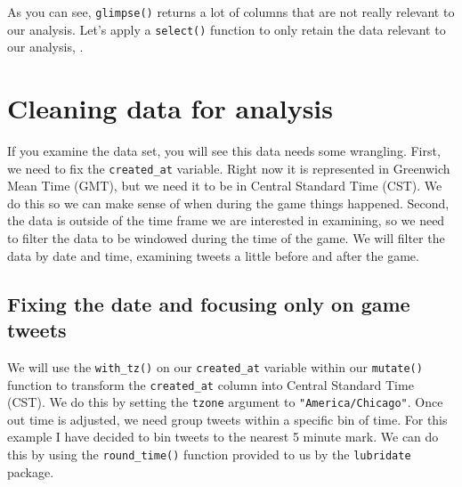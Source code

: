 \documentclass[
]{book}
\newenvironment{Shaded}{\begin{snugshade}}{\end{snugshade}}
\newcommand{\KeywordTok}[1]{\textcolor[rgb]{0.13,0.29,0.53}{\textbf{#1}}}
\newcommand{\NormalTok}[1]{#1}
\newcommand{\OperatorTok}[1]{\textcolor[rgb]{0.81,0.36,0.00}{\textbf{#1}}}
\newcommand{\StringTok}[1]{\textcolor[rgb]{0.31,0.60,0.02}{#1}}
\begin{document}
As you can see, \texttt{glimpse()} returns a lot of columns that are not really relevant to our analysis. Let's apply a \texttt{select()} function to only retain the data relevant to our analysis, .

\begin{Shaded}
\end{Shaded}

\hypertarget{cleaning-data-for-analysis}{%
\section{Cleaning data for analysis}\label{cleaning-data-for-analysis}}

If you examine the data set, you will see this data needs some wrangling. First, we need to fix the \texttt{created\_at} variable. Right now it is represented in Greenwich Mean Time (GMT), but we need it to be in Central Standard Time (CST). We do this so we can make sense of when during the game things happened. Second, the data is outside of the time frame we are interested in examining, so we need to filter the data to be windowed during the time of the game. We will filter the data by date and time, examining tweets a little before and after the game.

\hypertarget{fixing-the-date-and-focusing-only-on-game-tweets}{%
\subsection{Fixing the date and focusing only on game tweets}\label{fixing-the-date-and-focusing-only-on-game-tweets}}

We will use the \texttt{with\_tz()} on our \texttt{created\_at} variable within our \texttt{mutate()} function to transform the \texttt{created\_at} column into Central Standard Time (CST). We do this by setting the \texttt{tzone} argument to \texttt{"America/Chicago"}. Once out time is adjusted, we need group tweets within a specific bin of time. For this example I have decided to bin tweets to the nearest 5 minute mark. We can do this by using the \texttt{round\_time()} function provided to us by the \texttt{lubridate} package.
\end{document}

